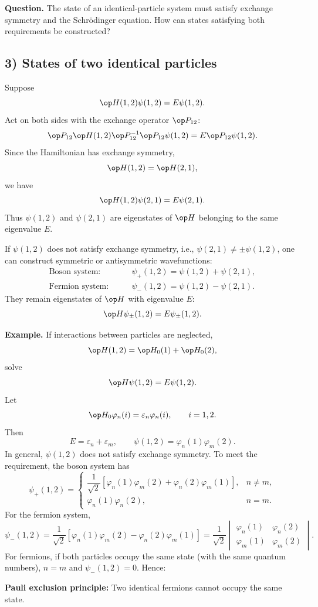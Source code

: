 \textbf{Question.} The state of an identical-particle system must satisfy exchange symmetry and the Schr\"odinger equation. How can states satisfying both requirements be constructed?

\subsection*{3) States of two identical particles}
Suppose
\[\op H(1,2)\psi(1,2)=E\psi(1,2).\]
Act on both sides with the exchange operator $\op P_{12}$:
\[\op P_{12}\op H(1,2)\op P_{12}^{-1}\op P_{12}\psi(1,2)
=E\op P_{12}\psi(1,2).\]
Since the Hamiltonian has exchange symmetry,
\[\op H(1,2)=\op H(2,1),\]
we have
\[\op H(1,2)\psi(2,1)=E\psi(2,1).\]
Thus $\psi(1,2)$ and $\psi(2,1)$ are eigenstates of $\op H$ belonging to the same eigenvalue $E$.

If $\psi(1,2)$ does not satisfy exchange symmetry, i.e., $\psi(2,1)\ne\pm\psi(1,2)$, one can construct symmetric or antisymmetric wavefunctions:
\begin{align*}
\text{Boson system:}\qquad&\psi_+(1,2)=\psi(1,2)+\psi(2,1),\\
\text{Fermion system:}\qquad&\psi_-(1,2)=\psi(1,2)-\psi(2,1).
\end{align*}
They remain eigenstates of $\op H$ with eigenvalue $E$:
\[\op H\psi_\pm(1,2)=E\psi_\pm(1,2).\]

\textbf{Example.} If interactions between particles are neglected,
\[\op H(1,2)=\op H_0(1)+\op H_0(2),\]
solve
\[\op H\psi(1,2)=E\psi(1,2).\]
Let
\[\op H_0\varphi_n(i)=\varepsilon_n\varphi_n(i),\qquad i=1,2.\]
Then
\[E=\varepsilon_n+\varepsilon_m,\qquad
\psi(1,2)=\varphi_n(1)\varphi_m(2).\]
In general, $\psi(1,2)$ does not satisfy exchange symmetry. To meet the requirement, the boson system has
\[
\psi_+(1,2)=\begin{cases}
\dfrac1{\sqrt2}[\varphi_n(1)\varphi_m(2)+\varphi_n(2)\varphi_m(1)],&n\ne m,\\[5pt]
\varphi_n(1)\varphi_n(2),&n=m.
\end{cases}
\]
For the fermion system,
\[\psi_-(1,2)=\frac1{\sqrt2}
[\varphi_n(1)\varphi_m(2)-\varphi_n(2)\varphi_m(1)]
=\frac1{\sqrt2}\begin{vmatrix}
\varphi_n(1)&\varphi_n(2)\\
\varphi_m(1)&\varphi_m(2)
\end{vmatrix}.\]
For fermions, if both particles occupy the same state (with the same quantum numbers), $n=m$ and $\psi_-(1,2)=0$. Hence:

\textbf{Pauli exclusion principle:} Two identical fermions cannot occupy the same state.

